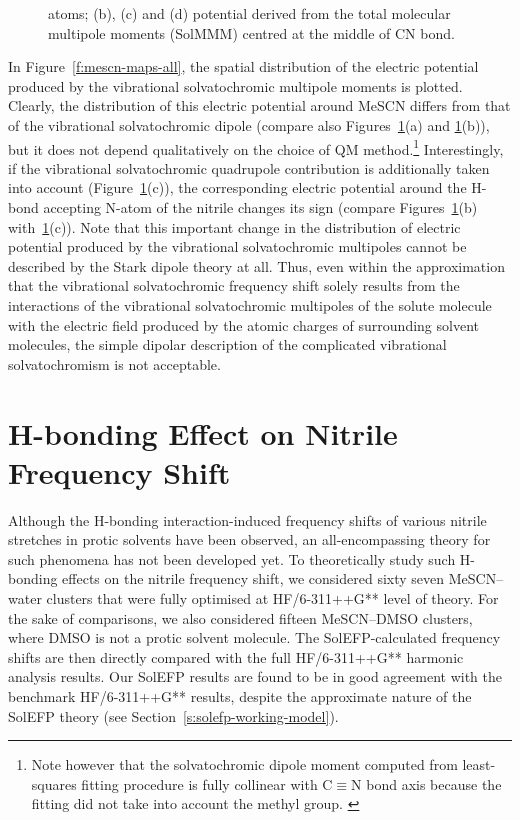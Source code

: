 \documentclass[b5paper,oneside,fleqn,11pt]{book}
\begin{document}
\begin{refsection}
\begin{figure}[t!]
{atoms; (b), (c) and (d) potential derived from the total molecular multipole moments (SolMMM) centred at the middle
of CN bond.
\label{f:mescn-maps}}
\end{figure}
%
In Figure~\ref{f:mescn-maps-all}, the spatial distribution of the electric
potential produced by the vibrational solvatochromic
multipole moments is plotted. Clearly, the distribution of this
electric potential around MeSCN differs from that of the
vibrational solvatochromic dipole (compare also Figures~\ref{f:mescn-maps}(a)
and \ref{f:mescn-maps}(b)), but it does not depend qualitatively
on the choice of QM method.\footnote{Note however
that the solvatochromic dipole moment
computed from least\hyp{}squares fitting procedure
is fully collinear with C$\equiv$N bond axis
because the fitting did not take into account the
methyl group. \citep{Lee.Choi.Cho.JCP.2012}} 
%
Interestingly, if
the vibrational solvatochromic quadrupole contribution is
additionally taken into account (Figure~\ref{f:mescn-maps}(c)), the corresponding
electric potential around the H-bond accepting N-atom of the
nitrile changes its sign (compare Figures~\ref{f:mescn-maps}(b) with~\ref{f:mescn-maps}(c)). Note
that this important change in the distribution of electric
potential produced by the vibrational solvatochromic
multipoles cannot be described by the Stark dipole theory at
all. Thus, even within the approximation that the vibrational
solvatochromic frequency shift solely results from the
interactions of the vibrational solvatochromic multipoles of
the solute molecule with the electric field produced by the
atomic charges of surrounding solvent molecules, the simple
dipolar description of the complicated vibrational
solvatochromism is not acceptable.

\section{H-bonding Effect on Nitrile Frequency Shift}

Although the H-bonding interaction\hyp{}induced frequency shifts
of various nitrile stre\-tches in protic solvents have been
observed, an all\hyp{}encompassing theory for such phenomena has
not been developed yet. To theoretically study such H-bonding
effects on the nitrile frequency shift, we considered sixty seven
MeSCN--water clusters that were fully optimised at HF/6-311++G** 
level of theory. For the sake of comparisons, we
also considered fifteen MeSCN--DMSO clusters, where DMSO is
not a protic solvent molecule. The SolEFP\hyp{}calculated frequency
shifts are then directly compared with the full HF/6-311++G**
harmonic analysis results. Our SolEFP results are found to be in
good agreement with the benchmark HF/6-311++G** results,
despite the approximate nature of the SolEFP theory (see
Section~\ref{s:solefp-working-model}).


\end{refsection}
\end{document}
